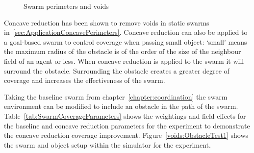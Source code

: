 \begin{figure}[H]
\centering
{}
\caption{Swarm perimeters and voids}
\label{fig:SwarmObjectVoids}
\end{figure}
 
Concave reduction has been shown to remove voids in static swarms in~\autoref{sec:ApplicationConcavePerimeters}. Concave reduction can also be applied to a goal-based swarm to control coverage when passing small object: `small' means the maximum radius of the obstacle is of the order of the size of the neighbour field of an agent or less. When concave reduction is applied to the swarm it will surround the obstacle. Surrounding the obstacle creates a greater degree of coverage and increases the effectiveness of the swarm.

Taking the baseline swarm from chapter~\ref{chapter:coordination} the swarm environment can be modified to include an obstacle in the path of the swarm. Table~\ref{tab:SwarmCoverageParameters} shows the weightings and field effects for the baseline and concave reduction parameters for the experiment to demonstrate the concave reduction coverage improvement. Figure~\ref{voids:ObstacleTest1} shows the swarm and object setup within the simulator for the experiment.

